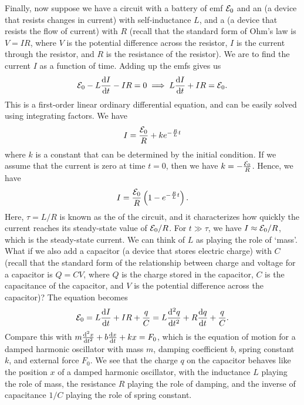 Finally, now suppose we have a circuit with a battery of emf $\mathcal{E}_{0}$ and an  (a device that resists changes in current) with self-inductance $L$, and a  (a device that resists the flow of current) with  $R$ (recall that the standard form of Ohm's law is $V = IR$, where $V$ is the potential difference across the resistor, $I$ is the current through the resistor, and $R$ is the resistance of the resistor). We are to find the current $I$ as a function of time. Adding up the emfs gives us
\begin{align}
    \mathcal{E}_{0} - L \frac{\mathrm{d}I}{\mathrm{d}t} - IR = 0 \implies L \frac{\mathrm{d}I}{\mathrm{d}t} + IR = \mathcal{E}_{0}.
\end{align}
This is a first-order linear ordinary differential equation, and can be easily solved using integrating factors. We have
\begin{align}
    I = \frac{\mathcal{E}_{0}}{R} + ke^{-\frac{R}{L}t}
\end{align}
where $k$ is a constant that can be determined by the initial condition. If we assume that the current is zero at time $t = 0$, then we have $k = -\frac{\mathcal{E}_{0}}{R}$. Hence, we have
\begin{align}
    I = \frac{\mathcal{E}_{0}}{R} \left( 1 - e^{-\frac{R}{L}t} \right).
\end{align}
Here, $\tau = L/R$ is known as the  of the circuit, and it characterizes how quickly the current reaches its steady-state value of $\mathcal{E}_{0}/R$. For $t \gg \tau$, we have $I \approx \mathcal{E}_{0}/R$, which is the steady-state current. We can think of $L$ as playing the role of `mass'. What if we also add a capacitor (a device that stores electric charge) with  $C$ (recall that the standard form of the relationship between charge and voltage for a capacitor is $Q = CV$, where $Q$ is the charge stored in the capacitor, $C$ is the capacitance of the capacitor, and $V$ is the potential difference across the capacitor)? The equation becomes
\begin{align}
    \mathcal{E}_{0} = L \frac{\mathrm{d}I}{\mathrm{d}t} + IR + \frac{q}{C} = L \frac{\mathrm{d}^{2}q}{\mathrm{d}t^{2}} + R \frac{\mathrm{d}q}{\mathrm{d}t} + \frac{q}{C}.
\end{align}
Compare this with $m \frac{\mathrm{d}^{2}x}{\mathrm{d}t^{2}} + b \frac{\mathrm{d}x}{\mathrm{d}t} + kx = F_{0}$, which is the equation of motion for a damped harmonic oscillator with mass $m$, damping coefficient $b$, spring constant $k$, and external force $F_{0}$. We see that the charge $q$ on the capacitor behaves like the position $x$ of a damped harmonic oscillator, with the inductance $L$ playing the role of mass, the resistance $R$ playing the role of damping, and the inverse of capacitance $1/C$ playing the role of spring constant.

